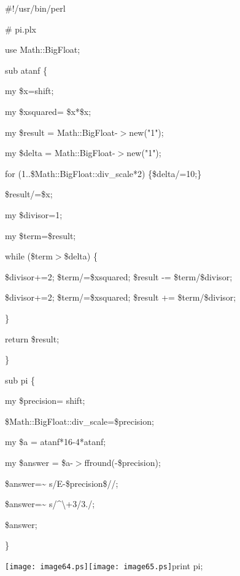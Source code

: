 \documentclass[a4paper,11pt]{book}
\begin{document}
\noindent 

\noindent 

\noindent \#!/usr/bin/perl

\noindent \# pi.plx

\noindent use Math::BigFloat;

\noindent 

\noindent 

\noindent sub atanf \{

\noindent my \$x=shift;

\noindent my \$xsquared= \$x*\$x;

\noindent my \$result = Math::BigFloat-$>$new("1");

\noindent my \$delta = Math::BigFloat-$>$new("1");

\noindent for (1..\$Math::BigFloat::div\_scale*2) \{\$delta/=10;\}

\noindent \$result/=\$x;

\noindent my \$divisor=1;

\noindent my \$term=\$result;

\noindent while (\$term$>$\$delta) \{

\noindent \$divisor+=2; \$term/=\$xsquared; \$result -= \$term/\$divisor;

\noindent \$divisor+=2; \$term/=\$xsquared; \$result += \$term/\$divisor;

\noindent \}

\noindent return \$result;

\noindent \}

\noindent 

\noindent sub pi \{

\noindent my \$precision= shift;

\noindent \$Math::BigFloat::div\_scale=\$precision;

\noindent my \$a = atanf*16-4*atanf;

\noindent my \$answer = \$a-$>$ffround(-\$precision);

\noindent \$answer=\~{} s/E-\$precision\$//;

\noindent \$answer=\~{} s/\^{}\textbackslash +3/3./;

\noindent \$answer;

\noindent \}

\noindent \texttt{[image: image64.ps]}\texttt{[image: image65.ps]}print pi;
\end{document}
